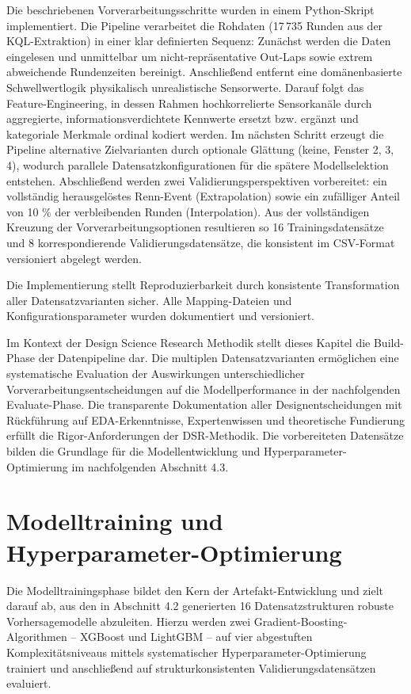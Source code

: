 Die beschriebenen Vorverarbeitungsschritte wurden in einem Python-Skript implementiert. Die Pipeline verarbeitet die Rohdaten (17\,735 Runden aus der KQL-Extraktion) in einer klar definierten Sequenz: Zunächst werden die Daten eingelesen und unmittelbar um nicht-repräsentative Out-Laps sowie extrem abweichende Rundenzeiten bereinigt. Anschließend entfernt eine domänenbasierte Schwellwertlogik physikalisch unrealistische Sensorwerte. Darauf folgt das Feature-Engineering, in dessen Rahmen hochkorrelierte Sensorkanäle durch aggregierte, informationsverdichtete Kennwerte ersetzt bzw. ergänzt und kategoriale Merkmale ordinal kodiert werden. Im nächsten Schritt erzeugt die Pipeline alternative Zielvarianten durch optionale Glättung (keine, Fenster 2, 3, 4), wodurch parallele Datensatzkonfigurationen für die spätere Modellselektion entstehen. Abschließend werden zwei Validierungsperspektiven vorbereitet: ein vollständig herausgelöstes Renn-Event (Extrapolation) sowie ein zufälliger Anteil von 10 \% der verbleibenden Runden (Interpolation). Aus der vollständigen Kreuzung der Vorverarbeitungsoptionen resultieren so 16 Trainingsdatensätze und 8 korrespondierende Validierungsdatensätze, die konsistent im CSV-Format versioniert abgelegt werden.

Die Implementierung stellt Reproduzierbarkeit durch konsistente Transformation aller Datensatzvarianten sicher. Alle Mapping-Dateien und Konfigurationsparameter wurden dokumentiert und versioniert.

Im Kontext der Design Science Research Methodik stellt dieses Kapitel die Build-Phase der Datenpipeline dar. Die multiplen Datensatzvarianten ermöglichen eine systematische Evaluation der Auswirkungen unterschiedlicher Vorverarbeitungsentscheidungen auf die Modellperformance in der nachfolgenden Evaluate-Phase. Die transparente Dokumentation aller Designentscheidungen mit Rückführung auf EDA-Erkenntnisse, Expertenwissen und theoretische Fundierung erfüllt die Rigor-Anforderungen der DSR-Methodik.
Die vorbereiteten Datensätze bilden die Grundlage für die Modellentwicklung und Hyperparameter-Optimierung im nachfolgenden Abschnitt 4.3.



\section{Modelltraining und Hyperparameter-Optimierung}

Die Modelltrainingsphase bildet den Kern der Artefakt-Entwicklung und zielt darauf ab, aus den in Abschnitt 4.2 generierten 16 Datensatzstrukturen robuste Vorhersagemodelle abzuleiten. Hierzu werden zwei Gradient-Boosting-Algorithmen – XGBoost und LightGBM – auf vier abgestuften Komplexitätsniveaus mittels systematischer Hyperparameter-Optimierung trainiert und anschließend auf strukturkonsistenten Validierungsdatensätzen evaluiert.

